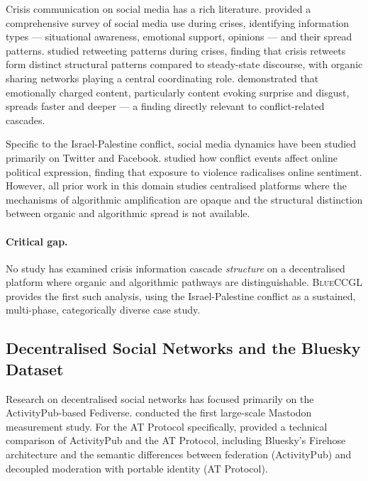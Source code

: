 \documentclass[12pt, a4paper]{article}
\newcommand{\BLUECCGL}{\textsc{BlueCCGL}\xspace}
\begin{document}
Crisis communication on social media has a rich literature. \citet{olteanu2015crisislex} provided a comprehensive survey of social media use during crises, identifying information types --- situational awareness, emotional support, opinions --- and their spread patterns. \citet{starbird2012retweeted} studied retweeting patterns during crises, finding that crisis retweets form distinct structural patterns compared to steady-state discourse, with organic sharing networks playing a central coordinating role. \citet{vosoughi2018spread} demonstrated that emotionally charged content, particularly content evoking surprise and disgust, spreads faster and deeper --- a finding directly relevant to conflict-related cascades.

Specific to the Israel-Palestine conflict, social media dynamics have been studied primarily on Twitter and Facebook. \citet{zeitzoff2017conflict} studied how conflict events affect online political expression, finding that exposure to violence radicalises online sentiment. However, all prior work in this domain studies centralised platforms where the mechanisms of algorithmic amplification are opaque and the structural distinction between organic and algorithmic spread is not available.

\paragraph{Critical gap.} No study has examined crisis information cascade \textit{structure} on a decentralised platform where organic and algorithmic pathways are distinguishable. \BLUECCGL provides the first such analysis, using the Israel-Palestine conflict as a sustained, multi-phase, categorically diverse case study.

\subsection{Decentralised Social Networks and the Bluesky Dataset}

Research on decentralised social networks has focused primarily on the ActivityPub-based Fediverse. \citet{zignani2018mastodon} conducted the first large-scale Mastodon measurement study. For the AT Protocol specifically, \citet{kleppmann2024bluesky} provided a technical comparison of ActivityPub and the AT Protocol, including Bluesky's Firehose architecture and the semantic differences between federation (ActivityPub) and decoupled moderation with portable identity (AT Protocol).
\end{document}
